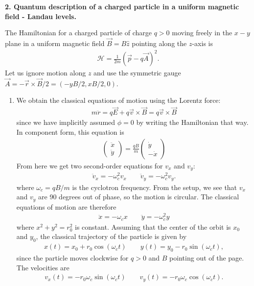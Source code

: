 \documentclass{article}
\theoremstyle{definition}
\newcommand{\ham}{\mathcal{H}}
\newcommand{\f}[2]{\frac{#1}{#2}}
\newcommand{\lp}{\left(}
\newcommand{\rp}{\right)}
\begin{document}
\noindent \textbf{2. Quantum description of a charged particle in a uniform magnetic field - Landau levels.}

\noindent The Hamiltonian for a charged particle of charge $q>0$ moving freely in the $x-y$ plane in a uniform magnetic field $\vec{B} = B\hat{z}$ pointing along the $z$-axis is
\begin{align*}
	\ham = \f{1}{2m}\lp \vec{p} - q\vec{A} \rp^2.
\end{align*}
Let us ignore motion along $z$ and use the symmetric gauge $\vec{A} = -\vec{r}\times \vec{B}/2 = (-yB/2, xB/2,0)$. 

\begin{enumerate}[label=\alph*)]
	
	\item We obtain the classical equations of motion using the Lorentz force:
	\begin{align*}
		m\ddot{r} = q\vec{E} + q \vec{v}\times \vec{B} = q \vec{v} \times \vec{B}
	\end{align*}
	since we have implicitly assumed $\phi = 0$ by writing the Hamiltonian that way. In component form, this equation is 
	\begin{align*}
		\begin{pmatrix}
			\ddot{x} \\ \ddot{y}
		\end{pmatrix}
	= \f{qB}{m}\begin{pmatrix}
		\dot{y} \\ -\dot{x}  
	\end{pmatrix} 
	\end{align*}
	From here we get two second-order equations for $v_x$ and $v_y$: 
	\begin{align*}
		\ddot{v}_x = -\omega_c^2 v_x \quad\quad \ddot{v}_y = -\omega_c^2 v_y.
	\end{align*}
	where $\omega_c = qB/m$ is the cyclotron frequency. From the setup, we see that $v_x$ and $v_y$ are 90 degrees out of phase, so the motion is circular. The classical equations of motion are therefore
	\begin{align*}
		\ddot{x} = -\omega_c x \quad\quad \ddot{y} = -\omega_c^2 y 
	\end{align*}
	where $x^2 + y^2 = r_0^2 $ is constant. Assuming that the center of the orbit is $x_0$ and $y_0$, the classical trajectory of the particle is given by 
	\begin{align*}
		x(t) = x_0 + r_0\cos(\omega_c t ) \quad\quad 
		y(t) = y_0 - r_0\sin(\omega_c t ),
	\end{align*}
	since the particle moves clockwise for $q>0$ and $B$ pointing out of the page. The velocities are
	\begin{align*}
		v_x(t) = -r_0\omega_c \sin(\omega_c t ) \quad\quad 
		v_y(t) = -r_0\omega_c \cos(\omega_c t ).
	\end{align*}


\end{enumerate}
\end{document}
